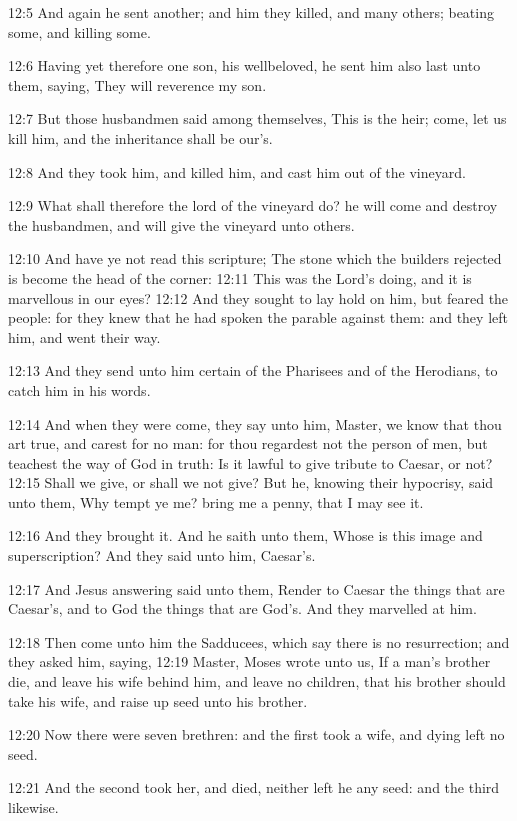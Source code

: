 12:5 And again he sent another; and him they killed, and many others;
beating some, and killing some.

12:6 Having yet therefore one son, his wellbeloved, he sent him also
last unto them, saying, They will reverence my son.

12:7 But those husbandmen said among themselves, This is the heir;
come, let us kill him, and the inheritance shall be our's.

12:8 And they took him, and killed him, and cast him out of the
vineyard.

12:9 What shall therefore the lord of the vineyard do? he will come
and destroy the husbandmen, and will give the vineyard unto others.

12:10 And have ye not read this scripture; The stone which the
builders rejected is become the head of the corner: 12:11 This was the
Lord's doing, and it is marvellous in our eyes?  12:12 And they sought
to lay hold on him, but feared the people: for they knew that he had
spoken the parable against them: and they left him, and went their
way.

12:13 And they send unto him certain of the Pharisees and of the
Herodians, to catch him in his words.

12:14 And when they were come, they say unto him, Master, we know that
thou art true, and carest for no man: for thou regardest not the
person of men, but teachest the way of God in truth: Is it lawful to
give tribute to Caesar, or not?  12:15 Shall we give, or shall we not
give? But he, knowing their hypocrisy, said unto them, Why tempt ye
me? bring me a penny, that I may see it.

12:16 And they brought it. And he saith unto them, Whose is this image
and superscription? And they said unto him, Caesar's.

12:17 And Jesus answering said unto them, Render to Caesar the things
that are Caesar's, and to God the things that are God's. And they
marvelled at him.

12:18 Then come unto him the Sadducees, which say there is no
resurrection; and they asked him, saying, 12:19 Master, Moses wrote
unto us, If a man's brother die, and leave his wife behind him, and
leave no children, that his brother should take his wife, and raise up
seed unto his brother.

12:20 Now there were seven brethren: and the first took a wife, and
dying left no seed.

12:21 And the second took her, and died, neither left he any seed: and
the third likewise.

